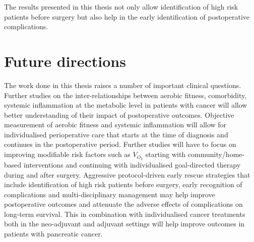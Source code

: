 The results presented in this thesis not only allow identification of high risk patients before surgery but also help in the early identification of postoperative complications. 

\section{Future directions}

The work done in this thesis raises a number of important clinical questions. 
Further studies on the inter-relationships between aerobic fitness, comorbidity, systemic inflammation at the metabolic level in patients with cancer will allow better understanding of their impact of postoperative outcomes. 
Objective measurement of aerobic fitness and systemic inflammation will allow for individualised perioperative care that starts at the time of diagnosis and continues in the postoperative period. 
Further studies will have to focus on improving modifiable risk factors such as $\dot{V}_{O_2}$ starting with community/home-based interventions and continuing with individualised goal-directed therapy during and after surgery.
Aggressive protocol-driven early rescue strategies that include identification of high risk patients before surgery, early recognition of complications and multi-disciplinary management may help improve postoperative outcomes and attenuate the adverse effects of complications on long-term survival.
This in combination with individualised cancer treatments both in the neo-adjuvant and adjuvant settings will help improve outcomes in patients with pancreatic cancer.


